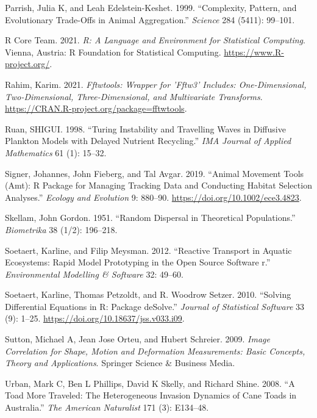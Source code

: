 \begin{CSLReferences}{1}{0}
\leavevmode{}%
Parrish, Julia K, and Leah Edelstein-Keshet. 1999. {``Complexity, Pattern, and Evolutionary Trade-Offs in Animal Aggregation.''} \emph{Science} 284 (5411): 99--101.

\leavevmode{}%
R Core Team. 2021. \emph{R: A Language and Environment for Statistical Computing}. Vienna, Austria: R Foundation for Statistical Computing. \url{https://www.R-project.org/}.

\leavevmode{}%
Rahim, Karim. 2021. \emph{Fftwtools: Wrapper for 'Fftw3' Includes: One-Dimensional, Two-Dimensional, Three-Dimensional, and Multivariate Transforms}. \url{https://CRAN.R-project.org/package=fftwtools}.

\leavevmode{}%
Ruan, SHIGUI. 1998. {``Turing Instability and Travelling Waves in Diffusive Plankton Models with Delayed Nutrient Recycling.''} \emph{IMA Journal of Applied Mathematics} 61 (1): 15--32.

\leavevmode{}%
Signer, Johannes, John Fieberg, and Tal Avgar. 2019. {``Animal Movement Tools (Amt): R Package for Managing Tracking Data and Conducting Habitat Selection Analyses.''} \emph{Ecology and Evolution} 9: 880--90. \url{https://doi.org/10.1002/ece3.4823}.

\leavevmode{}%
Skellam, John Gordon. 1951. {``Random Dispersal in Theoretical Populations.''} \emph{Biometrika} 38 (1/2): 196--218.

\leavevmode{}%
Soetaert, Karline, and Filip Meysman. 2012. {``Reactive Transport in Aquatic Ecosystems: Rapid Model Prototyping in the Open Source Software r.''} \emph{Environmental Modelling \& Software} 32: 49--60.

\leavevmode{}%
Soetaert, Karline, Thomas Petzoldt, and R. Woodrow Setzer. 2010. {``Solving Differential Equations in {R}: Package de{S}olve.''} \emph{Journal of Statistical Software} 33 (9): 1--25. \url{https://doi.org/10.18637/jss.v033.i09}.

\leavevmode{}%
Sutton, Michael A, Jean Jose Orteu, and Hubert Schreier. 2009. \emph{Image Correlation for Shape, Motion and Deformation Measurements: Basic Concepts, Theory and Applications}. Springer Science \& Business Media.

\leavevmode{}%
Urban, Mark C, Ben L Phillips, David K Skelly, and Richard Shine. 2008. {``A Toad More Traveled: The Heterogeneous Invasion Dynamics of Cane Toads in Australia.''} \emph{The American Naturalist} 171 (3): E134--48.


\end{CSLReferences}
